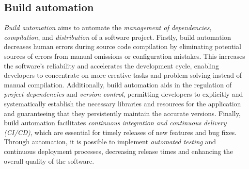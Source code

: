 \documentclass[12pt,a4paper,openright,twoside]{book}
\begin{document}
\subsection*{Build automation}

\emph{Build automation} aims to automate the \emph{management of dependencies}, \emph{compilation}, and 
    \emph{distribution} of a software project.
    Firstly, build automation decreases human errors during source code compilation by eliminating potential 
    sources of errors from manual omissions or configuration mistakes. This increases the software's reliability 
    and accelerates the development cycle, enabling developers to concentrate on more creative tasks and 
    problem-solving instead of manual compilation.
    Additionally, build automation aids in the regulation of \emph{project dependencies} and \emph{version control}, 
    permitting developers to explicitly and systematically establish the necessary libraries and resources 
    for the application and guaranteeing that they persistently maintain the accurate versions.
    Finally, build automation facilitates \emph{continuous integration and continuous delivery (CI/CD)},
    which are essential for timely releases of new features and bug fixes. 
    Through automation, it is possible to implement \emph{automated testing} and continuous deployment processes, 
    decreasing release times and enhancing the overall quality of the software.
\end{document}
